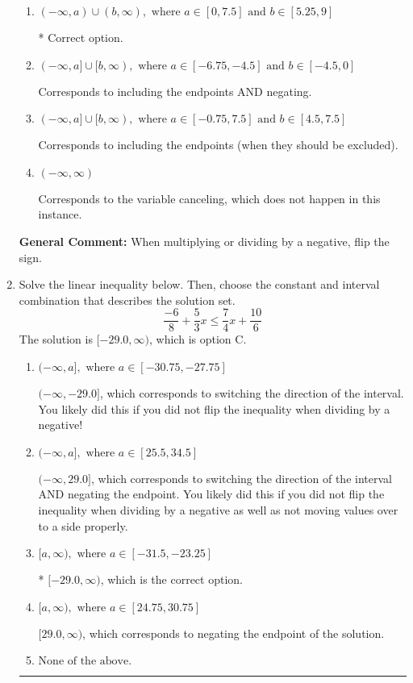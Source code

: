 \documentclass{extbook}[14pt]
\newcommand{\litem}[1]{\item #1

\rule{\textwidth}{0.4pt}}
\begin{document}
\begin{enumerate}
{\begin{enumerate}[label=\Alph*.]
Corresponds to inverting the inequality and negating the solution.
\item \( (-\infty, a) \cup (b, \infty), \text{ where } a \in [0, 7.5] \text{ and } b \in [5.25, 9] \)

 * Correct option.
\item \( (-\infty, a] \cup [b, \infty), \text{ where } a \in [-6.75, -4.5] \text{ and } b \in [-4.5, 0] \)

Corresponds to including the endpoints AND negating.
\item \( (-\infty, a] \cup [b, \infty), \text{ where } a \in [-0.75, 7.5] \text{ and } b \in [4.5, 7.5] \)

Corresponds to including the endpoints (when they should be excluded).
\item \( (-\infty, \infty) \)

Corresponds to the variable canceling, which does not happen in this instance.
\end{enumerate}

\textbf{General Comment:} When multiplying or dividing by a negative, flip the sign.
}
\litem{
Solve the linear inequality below. Then, choose the constant and interval combination that describes the solution set.
\[ \frac{-6}{8} + \frac{5}{3} x \leq \frac{7}{4} x + \frac{10}{6} \]The solution is \( [-29.0, \infty) \), which is option C.\begin{enumerate}[label=\Alph*.]
\item \( (-\infty, a], \text{ where } a \in [-30.75, -27.75] \)

 $(-\infty, -29.0]$, which corresponds to switching the direction of the interval. You likely did this if you did not flip the inequality when dividing by a negative!
\item \( (-\infty, a], \text{ where } a \in [25.5, 34.5] \)

 $(-\infty, 29.0]$, which corresponds to switching the direction of the interval AND negating the endpoint. You likely did this if you did not flip the inequality when dividing by a negative as well as not moving values over to a side properly.
\item \( [a, \infty), \text{ where } a \in [-31.5, -23.25] \)

* $[-29.0, \infty)$, which is the correct option.
\item \( [a, \infty), \text{ where } a \in [24.75, 30.75] \)

 $[29.0, \infty)$, which corresponds to negating the endpoint of the solution.
\item \( \text{None of the above}. \)


\end{enumerate}}
\end{enumerate}
\end{document}
